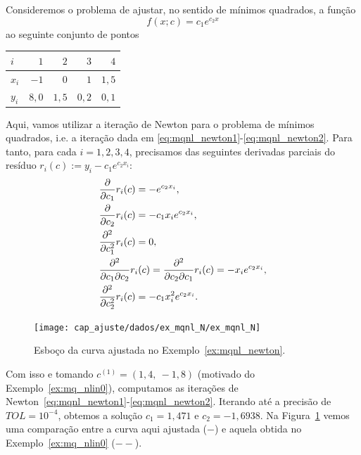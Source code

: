 \begin{ex}\label{ex:mqnl_newton}
  Consideremos o problema de ajustar, no sentido de mínimos quadrados, a função
  \begin{equation}
    f(x;c) = c_1e^{c_2x}
  \end{equation}
ao seguinte conjunto de pontos
\begin{center}
  \begin{tabular}{l|rrrr}
    $i$ & $1$ & $2$ & $3$ & $4$ \\\hline
    $x_i$ & $-1$ & $0$ & $1$ & $1,5$\\
    $y_i$ & $8,0$ & $1,5$ & $0,2$ & $0,1$\\\hline
  \end{tabular}
\end{center}

Aqui, vamos utilizar a iteração de Newton para o problema de mínimos quadrados, i.e. a iteração dada em \eqref{eq:mqnl_newton1}-\eqref{eq:mqnl_newton2}. Para tanto, para cada $i=1, 2, 3, 4$, precisamos das seguintes derivadas parciais do resíduo $r_i(c) := y_i - c_1e^{c_2x_i}$:
\begin{align}
  &\frac{\partial}{\partial c_1}r_i(c) = - e^{c_2x_i},\\
  &\frac{\partial}{\partial c_2}r_i(c) = - c_1x_ie^{c_2x_i},\\
  &\frac{\partial^2}{\partial c_1^2}r_i(c) = 0,\\
  &\frac{\partial^2}{\partial c_1\partial c_2}r_i(c) = \frac{\partial^2}{\partial c_2\partial c_1}r_i(c) = - x_ie^{c_2x_i},\\
  &\frac{\partial^2}{\partial c_2^2}r_i(c) = - c_1x_i^2e^{c_2x_i}.
\end{align}

\begin{figure}[h]
  \centering
  \texttt{[image: cap\_ajuste/dados/ex\_mqnl\_N/ex\_mqnl\_N]}
  \caption{Esboço da curva ajustada no Exemplo~\ref{ex:mqnl_newton}.}
  \label{fig:ex_mqnl_newton}
\end{figure}

Com isso e tomando $c^{(1)} = (1,4, ~-1,8)$ (motivado do Exemplo~\ref{ex:mq_nlin0}), computamos as iterações de Newton~\eqref{eq:mqnl_newton1}-\eqref{eq:mqnl_newton2}. Iterando até a precisão de $TOL = 10^{-4}$, obtemos a solução $c_1 = 1,471$ e $c_2 = -1,6938$. Na Figura~\ref{fig:ex_mqnl_newton} vemos uma comparação entre a curva aqui ajustada ($-$) e aquela obtida no Exemplo~\ref{ex:mq_nlin0} ($--$).



\end{ex}
